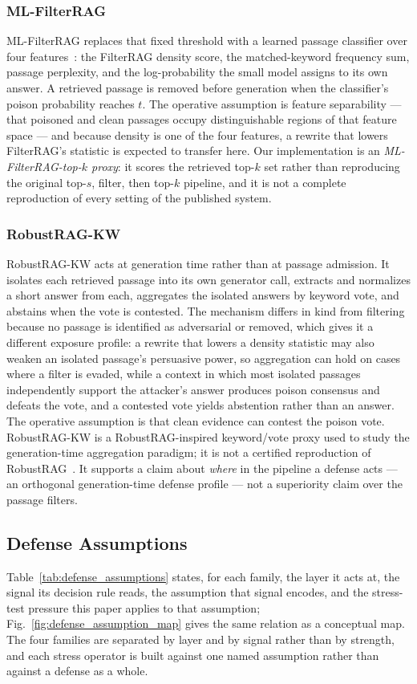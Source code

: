 \documentclass[conference]{IEEEtran}
\begin{document}
\subsubsection{ML-FilterRAG}
ML-FilterRAG replaces that fixed threshold with a learned passage classifier
over four features~\cite{edemacu2025filterrag}: the FilterRAG density score, the
matched-keyword frequency sum, passage perplexity, and the log-probability the
small model assigns to its own answer. A retrieved passage is removed before
generation when the classifier's poison probability reaches $t$. The operative
assumption is feature separability --- that poisoned and clean passages occupy
distinguishable regions of that feature space --- and because density is one of
the four features, a rewrite that lowers FilterRAG's statistic is expected to
transfer here. Our implementation is an \emph{ML-FilterRAG-top-$k$ proxy}: it
scores the retrieved top-$k$ set rather than reproducing the original
top-$s$, filter, then top-$k$ pipeline, and it is not a complete reproduction of
every setting of the published system.

\subsubsection{RobustRAG-KW}
RobustRAG-KW acts at generation time rather than at passage admission. It
isolates each retrieved passage into its own generator call, extracts and
normalizes a short answer from each, aggregates the isolated answers by keyword
vote, and abstains when the vote is contested. The mechanism differs in kind
from filtering because no passage is identified as adversarial or removed, which
gives it a different exposure profile: a rewrite that lowers a density statistic
may also weaken an isolated passage's persuasive power, so aggregation can hold
on cases where a filter is evaded, while a context in which most isolated
passages independently support the attacker's answer produces poison consensus
and defeats the vote, and a contested vote yields abstention rather than an
answer. The operative assumption is that clean evidence can contest the poison
vote. RobustRAG-KW is a RobustRAG-inspired keyword/vote proxy used to study the
generation-time aggregation paradigm; it is not a certified reproduction of
RobustRAG~\cite{xiang2024robustrag}. It supports a claim about \emph{where} in
the pipeline a defense acts --- an orthogonal generation-time defense profile ---
not a superiority claim over the passage filters.

\subsection{Defense Assumptions}
\label{subsec:assumptions}
Table~\ref{tab:defense_assumptions} states, for each family, the layer it acts
at, the signal its decision rule reads, the assumption that signal encodes, and
the stress-test pressure this paper applies to that assumption;
Fig.~\ref{fig:defense_assumption_map} gives the same relation as a conceptual
map. The four families are separated by layer and by signal rather than by
strength, and each stress operator is built against one named assumption rather
than against a defense as a whole.
\end{document}
